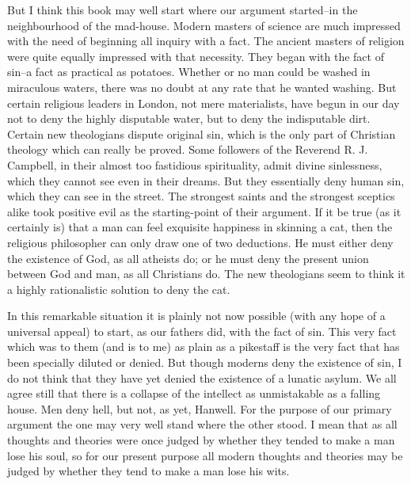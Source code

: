 \documentclass{book}
\begin{document}
But I think this book may well start where our argument started–in the neighbourhood of the mad-house. Modern masters of science are much impressed with the need of beginning all inquiry with a fact. The ancient masters of religion were quite equally impressed with that necessity. They began with the fact of sin–a fact as practical as potatoes. Whether or no man could be washed in miraculous waters, there was no doubt at any rate that he wanted washing. But certain religious leaders in London, not mere materialists, have begun in our day not to deny the highly disputable water, but to deny the indisputable dirt. Certain new theologians dispute original sin, which is the only part of Christian theology which can really be proved. Some followers of the Reverend R. J. Campbell, in their almost too fastidious spirituality, admit divine sinlessness, which they cannot see even in their dreams. But they essentially deny human sin, which they can see in the street. The strongest saints and the strongest sceptics alike took positive evil as the starting-point of their argument. If it be true (as it certainly is) that a man can feel exquisite happiness in skinning a cat, then the religious philosopher can only draw one of two deductions. He must either deny the existence of God, as all atheists do; or he must deny the present union between God and man, as all Christians do. The new theologians seem to think it a highly rationalistic solution to deny the cat.

In this remarkable situation it is plainly not now possible (with any hope of a universal appeal) to start, as our fathers did, with the fact of sin. This very fact which was to them (and is to me) as plain as a pikestaff is the very fact that has been specially diluted or denied. But though moderns deny the existence of sin, I do not think that they have yet denied the existence of a lunatic asylum. We all agree still that there is a collapse of the intellect as unmistakable as a falling house. Men deny hell, but not, as yet, Hanwell. For the purpose of our primary argument the one may very well stand where the other stood. I mean that as all thoughts and theories were once judged by whether they tended to make a man lose his soul, so for our present purpose all modern thoughts and theories may be judged by whether they tend to make a man lose his wits.
\end{document}
